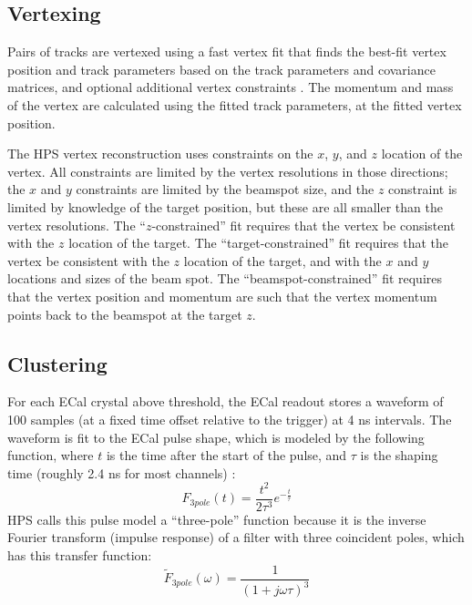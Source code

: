 \subsection{Vertexing}
\label{sec:vertex_recon}
Pairs of tracks are vertexed using a fast vertex fit that finds the best-fit vertex position and track parameters based on the track parameters and covariance matrices, and optional additional vertex constraints \cite{billoir_fast_1992}.
The momentum and mass of the vertex are calculated using the fitted track parameters, at the fitted vertex position.

The HPS vertex reconstruction uses constraints on the $x$, $y$, and $z$ location of the vertex.
All constraints are limited by the vertex resolutions in those directions; the $x$ and $y$ constraints are limited by the beamspot size, and the $z$ constraint is limited by knowledge of the target position, but these are all smaller than the vertex resolutions.
The ``$z$-constrained'' fit requires that the vertex be consistent with the $z$ location of the target.
The ``target-constrained'' fit requires that the vertex be consistent with the $z$ location of the target, and with the $x$ and $y$ locations and sizes of the beam spot.
The ``beamspot-constrained'' fit requires that the vertex position and momentum are such that the vertex momentum points back to the beamspot at the target $z$.

\subsection{Clustering}
\label{sec:clustering}
For each ECal crystal above threshold, the ECal readout stores a waveform of 100 samples (at a fixed time offset relative to the trigger) at 4 ns intervals.
The waveform is fit to the ECal pulse shape, which is modeled by the following function, where $t$ is the time after the start of the pulse, and $\tau$ is the shaping time (roughly 2.4 ns for most channels) \cite{baltzell_ecal_2015}:
\begin{equation}
    F_{3pole}(t) = \frac{t^2}{2\tau^3} e^{-\frac{t}{\tau}}
\end{equation}
HPS calls this pulse model a ``three-pole'' function because it is the inverse Fourier transform (impulse response) of a filter with three coincident poles, which has this transfer function:
\begin{equation}
    \tilde{F}_{3pole}(\omega) = \frac{1}{(1+j\omega\tau)^3}
\end{equation}


